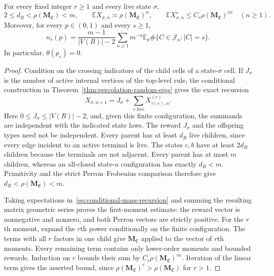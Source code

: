 \begin{lemma}\label{lem:conditional-mass-moments}
For every fixed integer $r\ge1$ and every live state $\sigma$,
\[
 2\le d_R<\rho(\mathbf M_{\mathfrak C})<m,\qquad
 \mathbb E X_{\sigma,n}\asymp\rho(\mathbf M_{\mathfrak C})^n,
 \qquad
 \mathbb E X_{\sigma,n}^{r}\le C_r\rho(\mathbf M_{\mathfrak C})^{rn}
 \quad(n\ge1).
\]
Moreover, for every $p\in(0,1)$ and every $s\ge1$,
\begin{equation}\label{eq:birth-cluster-series}
 n_s(p)=\frac{m-1}{|V(R)|-2}
 \sum_{n\ge1}m^{-n}\mathbb E_p
 \#\{C\in\mathcal J_n:|C|=s\}.
\end{equation}
In particular, $\theta(p_c)=0$.
\end{lemma}
\begin{proof}
Condition on the crossing indicators of the child cells of a state-$\sigma$ cell.
If $J_\sigma$ is the number of active internal vertices of the top-level rule, the conditional construction in Theorem~\ref{thm:percolation-random-eigs} gives the exact recursion
\begin{equation}\label{eq:conditional-mass-recursion}
 X_{\sigma,n+1}=J_\sigma+
 \sum_{e\text{ live}}X_{\tau(e),n}^{(e)}.
\end{equation}
Here $0\le J_\sigma\le |V(R)|-2$, and, given this finite configuration, the summands are independent with the indicated state laws.
The reward $J_\sigma$ and the offspring types need not be independent.
Every parent has at least $d_R$ live children, since every edge incident to an active terminal is live.
The states $c,b$ have at least $2d_R$ children because the terminals are not adjacent.
Every parent has at most $m$ children, whereas an all-closed state-$u$ configuration has exactly $d_R<m$.
Primitivity and the strict Perron--Frobenius comparison therefore give $d_R<\rho(\mathbf M_{\mathfrak C})<m$.

Taking expectations in~\eqref{eq:conditional-mass-recursion} and summing the resulting matrix geometric series proves the first-moment estimate: the reward vector is nonnegative and nonzero, and both Perron vectors are strictly positive.
For the $r$th moment, expand the $r$th power conditionally on the finite configuration.
The terms with all $r$ factors in one child give $\mathbf M_{\mathfrak C}$ applied to the vector of $r$th moments.
Every remaining term contains only lower-order moments and bounded rewards.
Induction on $r$ bounds their sum by $C_r\rho(\mathbf M_{\mathfrak C})^{rn}$.
Iteration of the linear term gives the asserted bound, since $\rho(\mathbf M_{\mathfrak C})^r>\rho(\mathbf M_{\mathfrak C})$ for $r>1$.


\end{proof}

